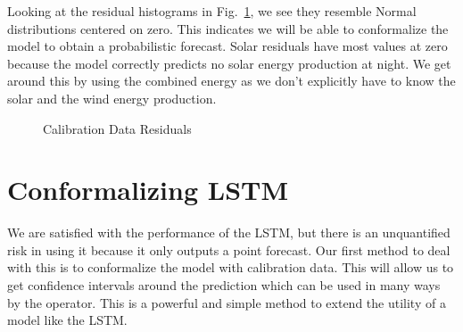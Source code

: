 \documentclass[
  journal,
]{IEEEtran}%
\begin{document}
Looking at the residual histograms in
Fig.~\ref{fig-calib-residuals-histograms}, we see they resemble Normal
distributions centered on zero. This indicates we will be able to
conformalize the model to obtain a probabilistic forecast. Solar
residuals have most values at zero because the model correctly predicts
no solar energy production at night. We get around this by using the
combined energy as we don't explicitly have to know the solar and the
wind energy production.

\begin{figure}


\caption{\label{fig-calib-residuals-histograms}Calibration Data
Residuals}

\end{figure}%

\section{Conformalizing LSTM}\label{conformalizing-lstm}

We are satisfied with the performance of the LSTM, but there is an
unquantified risk in using it because it only outputs a point forecast.
Our first method to deal with this is to conformalize the model with
calibration data. This will allow us to get confidence intervals around
the prediction which can be used in many ways by the operator. This is a
powerful and simple method to extend the utility of a model like the
LSTM.
\end{document}
